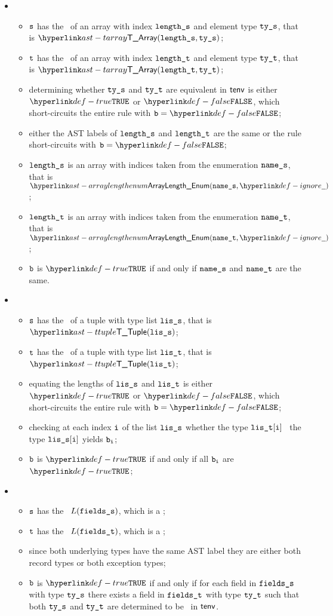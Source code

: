 \begin{itemize}
  \item {}
  \begin{itemize}
  \item $\texttt{s}$ has the \underlyingtype\ of an array with index $\texttt{length\_s}$ and element type $\texttt{ty\_s}$, that is $\TArray(\vlengths, \vtys)$;
  \item $\texttt{t}$ has the \underlyingtype\ of an array with index $\texttt{length\_t}$ and element type $\texttt{ty\_t}$, that is $\TArray(\vlengtht, \vtyt)$;
  \item determining whether $\texttt{ty\_s}$ and $\texttt{ty\_t}$ are equivalent in $\textsf{tenv}$ is either $\True$
  or $\False$, which short-circuits the entire rule with $\vb=\False$;
  \item either the AST labels of $\texttt{length\_s}$ and $\texttt{length\_t}$ are the same or the rule short-circuits with $\vb=\False$;
  \item $\texttt{length\_s}$ is an array with indices taken from the enumeration $\texttt{name\_s}$, that is $\ArrayLengthEnum(\vnames, \Ignore)$;
  \item $\texttt{length\_t}$ is an array with indices taken from the enumeration $\texttt{name\_t}$, that is $\ArrayLengthEnum(\vnamet, \Ignore)$;
  \item $\texttt{b}$ is $\True$ if and only if $\texttt{name\_s}$ and $\texttt{name\_t}$ are the same.
  \end{itemize}

\item {}
  \begin{itemize}
  \item $\texttt{s}$ has the \underlyingtype\ of a tuple with type list $\texttt{lis\_s}$, that is $\TTuple(\vlis)$;
  \item $\texttt{t}$ has the \underlyingtype\ of a tuple with type list $\texttt{lis\_t}$, that is $\TTuple(\vlit)$;
  \item equating the lengths of $\texttt{lis\_s}$ and $\texttt{lis\_t}$ is either $\True$ or $\False$, which short-circuits
  the entire rule with $\vb=\False$;
  \item checking at each index $\texttt{i}$ of the list $\texttt{lis\_s}$ whether the type $\texttt{lis\_t}[\texttt{i}]$ \typesatisfies\ the type $\texttt{lis\_s}[\texttt{i}]$
  yields $\texttt{b}_{\texttt{i}}$\ProseOrTypeError;
  \item $\texttt{b}$ is $\True$ if and only if all $\texttt{b}_{\texttt{i}}$ are $\True$;
  \end{itemize}

\item {}
  \begin{itemize}
  \item $\texttt{s}$ has the \underlyingtype\ $L(\texttt{fields\_s})$, which is a \structuredtype;
  \item $\texttt{t}$ has the \underlyingtype\ $L(\texttt{fields\_t})$, which is a \structuredtype;
  \item since both underlying types have the same AST label they are either both record types or both exception types;
  \item $\texttt{b}$ is $\True$ if and only if for each field in $\texttt{fields\_s}$ with type $\texttt{ty\_s}$
  there exists a field in $\texttt{fields\_t}$ with type $\texttt{ty\_t}$ such that both $\texttt{ty\_s}$ and $\texttt{ty\_t}$
  are determined to be \typeequivalent\ in $\textsf{tenv}$.
  \end{itemize}
\end{itemize}

